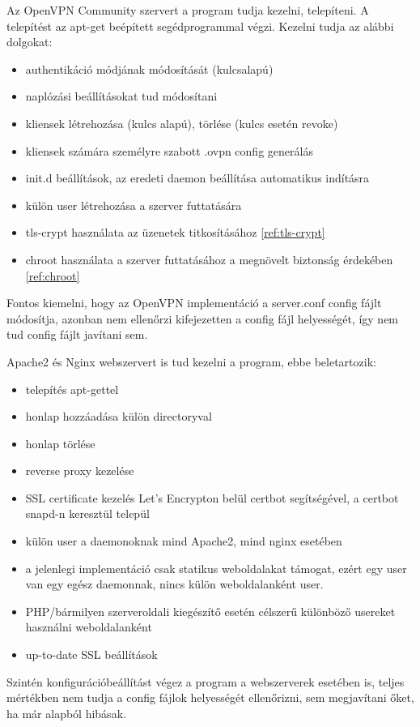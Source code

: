Az OpenVPN Community szervert a program tudja kezelni, telepíteni. A telepítést az apt-get beépített segédprogrammal végzi. Kezelni tudja az alábbi dolgokat:
\begin{itemize}
	\item authentikáció módjának módosítását (kulcsalapú)
	\item naplózási beállításokat tud módosítani
	\item kliensek létrehozása (kulcs alapú), törlése (kulcs esetén revoke)
	\item kliensek számára személyre szabott .ovpn config generálás
	\item init.d beállítások, az eredeti daemon beállítása automatikus indításra
	\item külön user létrehozása a szerver futtatására
	\item tls-crypt használata az üzenetek titkosításához \ref{ref:tls-crypt}
	\item chroot használata a szerver futtatásához a megnövelt biztonság érdekében \ref{ref:chroot}
\end{itemize}
Fontos kiemelni, hogy az OpenVPN implementáció a server.conf config fájlt módosítja, azonban nem ellenőrzi kifejezetten a config fájl helyességét, így nem tud config fájlt javítani sem.

Apache2 és Nginx webszervert is tud kezelni a program, ebbe beletartozik:
\begin{itemize}
	\item telepítés apt-gettel
	\item honlap hozzáadása külön directoryval
	\item honlap törlése
	\item reverse proxy kezelése
	\item SSL certificate kezelés Let's Encrypton belül certbot segítségével, a certbot snapd-n keresztül települ
	\item külön user a daemonoknak mind Apache2, mind nginx esetében
	\item a jelenlegi implementáció csak statikus weboldalakat támogat, ezért egy user van egy egész daemonnak, nincs külön weboldalanként user.
	\item PHP/bármilyen szerveroldali kiegészítő esetén célszerű különböző usereket használni weboldalanként
	\item up-to-date SSL beállítások
\end{itemize}

Szintén konfigurációbeállítást végez a program a webszerverek esetében is, teljes mértékben nem tudja a config fájlok helyességét ellenőrizni, sem megjavítani őket, ha már alapból hibásak.

